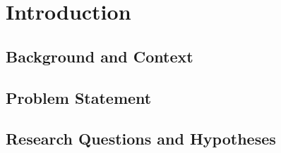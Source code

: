 \chapter{Introduction}\label{ch:intro}

\section{Background and Context}

\section{Problem Statement}

\section{Research Questions and Hypotheses}\label{sec:rqs}


